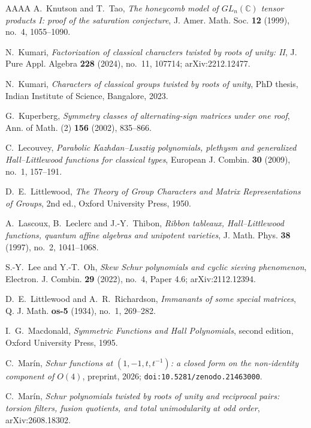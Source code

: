\documentclass[11pt,reqno]{amsart}
\theoremstyle{plain}
\theoremstyle{definition}
\newcommand{\CC}{\mathbb{C}}
\begin{document}
\begin{thebibliography}{AAAA}
 A.~Knutson and T.~Tao, \emph{The honeycomb model of $GL_n(\CC)$ tensor
products I: proof of the saturation conjecture}, J. Amer. Math. Soc. \textbf{12} (1999), no.~4,
1055--1090.

 N.~Kumari, \emph{Factorization of classical characters twisted by roots of
unity: II}, J. Pure Appl. Algebra \textbf{228} (2024), no.~11, 107714; arXiv:2212.12477.

 N.~Kumari, \emph{Characters of classical groups twisted by roots of
unity}, PhD thesis, Indian Institute of Science, Bangalore, 2023.

 G.~Kuperberg, \emph{Symmetry classes of alternating-sign matrices under one
roof}, Ann. of Math. (2) \textbf{156} (2002), 835--866.

 C.~Lecouvey, \emph{Parabolic Kazhdan--Lusztig polynomials, plethysm and
generalized Hall--Littlewood functions for classical types}, European J. Combin. \textbf{30} (2009),
no.~1, 157--191.

 D.~E.~Littlewood, \emph{The Theory of Group Characters and Matrix
Representations of Groups}, 2nd ed., Oxford University Press, 1950.

 A.~Lascoux, B.~Leclerc and J.-Y.~Thibon, \emph{Ribbon tableaux,
Hall--Littlewood functions, quantum affine algebras and unipotent varieties}, J. Math. Phys.
\textbf{38} (1997), no.~2, 1041--1068.

 S.-Y.~Lee and Y.-T.~Oh, \emph{Skew Schur polynomials and cyclic sieving
phenomenon}, Electron. J. Combin. \textbf{29} (2022), no.~4, Paper 4.6; arXiv:2112.12394.

 D.~E.~Littlewood and A.~R.~Richardson, \emph{Immanants of some special
matrices}, Q. J. Math. \textbf{os-5} (1934), no.~1, 269--282.

 I.~G.~Macdonald, \emph{Symmetric Functions and Hall Polynomials}, second
edition, Oxford University Press, 1995.

 C.~Mar\'in, \emph{Schur functions at $(1,-1,t,t^{-1})$: a closed form on the
non-identity component of $O(4)$}, preprint, 2026; \texttt{doi:10.5281/zenodo.21463000}.

 C.~Mar\'in, \emph{Schur polynomials twisted by roots of unity
and reciprocal pairs: torsion filters, fusion quotients, and total unimodularity at odd
order}, arXiv:2608.18302.


\end{thebibliography}
\end{document}
